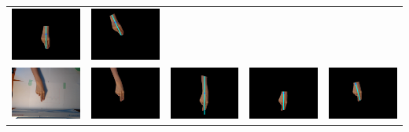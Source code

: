 \begin{tabular}{lllll}
\includegraphics[width=3.5cm]{fig4/2-d.png} &
\includegraphics[width=3.5cm]{fig4/2-e.png} \\
\includegraphics[width=3.5cm]{fig4/3-a.png} &
\includegraphics[width=3.5cm]{fig4/3-b.png} &
\includegraphics[width=3.5cm]{fig4/3-c.png} &
\includegraphics[width=3.5cm]{fig4/3-d.png} &
\includegraphics[width=3.5cm]{fig4/3-e.png}
\end{tabular}
